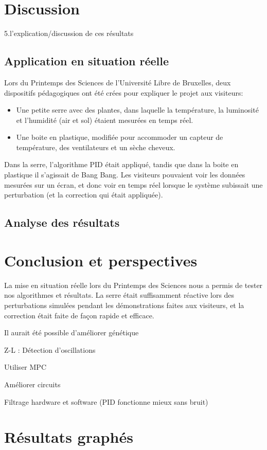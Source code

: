\documentclass[a4paper,10pt]{report}
\begin{document}
\chapter{Discussion}
5.l’explication/discussion de ces résultats

\section{Application en situation réelle}


Lors du Printemps des Sciences de l'Université Libre de Bruxelles, deux dispositifs pédagogiques ont été crées pour expliquer le projet aux visiteurs:

\begin{itemize}
\item Une petite serre avec des plantes, dans laquelle la température, la luminosité et l'humidité (air et sol) étaient mesurées en temps réel.
\item Une boite en plastique, modifiée pour accommoder un capteur de température, des ventilateurs et un sèche cheveux.
\end{itemize}

Dans la serre, l'algorithme PID était appliqué, tandis que dans la boite en plastique il s'agissait de Bang Bang. Les visiteurs pouvaient voir les données mesurées sur un écran, et donc voir en temps réel lorsque le système subissait une perturbation (et la correction qui était appliquée).

\section{Analyse des résultats}

\chapter{Conclusion et perspectives}

La mise en situation réelle lors du Printemps des Sciences nous a permis de tester nos algorithmes et résultats. La serre était suffisamment réactive lors des perturbations simulées pendant les démonstrations faites aux visiteurs, et la correction était faite de façon rapide et efficace.

Il aurait été possible d'améliorer génétique %

Z-L : Détection d'oscillations

Utiliser MPC

Améliorer circuits

Filtrage hardware et software (PID fonctionne mieux sans bruit)







\appendix

\chapter{Résultats graphés}
\end{document}
